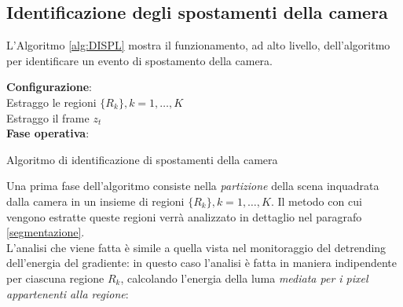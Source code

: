 \subsection{Identificazione degli spostamenti della camera}
L'Algoritmo \ref{alg:DISPL} mostra il funzionamento, ad alto livello, dell'algoritmo per identificare un evento di spostamento della camera.\\
\begin{algorithm}[t]
	\LinesNumbered
	\textbf{Configurazione}:\\
	 Estraggo le regioni $\{R_k\}, k=1,\dots,K$  \\
	 
	{	 Estraggo il frame $z_t$ \\
		 
	}
	 
	\textbf{Fase operativa}:\\
	    
	\caption{Algoritmo di identificazione di spostamenti della camera}
	\label{alg:DISPL}
\end{algorithm}
Una prima fase dell'algoritmo consiste nella \textit{partizione} della scena inquadrata dalla camera in un insieme di regioni $\{R_k\}, k=1,\dots,K$.
Il metodo con cui vengono estratte queste regioni verr\`a analizzato in dettaglio nel paragrafo \ref{segmentazione}. \\
L'analisi che viene fatta \`e simile a quella vista nel monitoraggio del detrending dell'energia del gradiente:
in questo caso l'analisi \`e fatta in maniera indipendente per ciascuna regione $R_k$, calcolando l'energia della luma \textit{mediata per i pixel appartenenti alla regione}:
